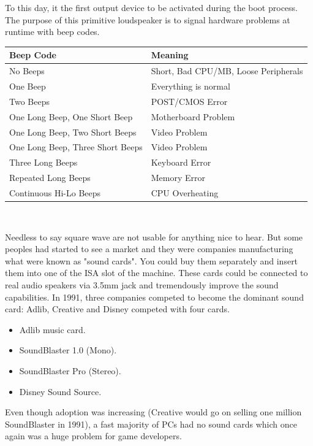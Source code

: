\documentclass[book.tex]{subfiles}
\begin{document}
\par
 To this day, it the first output device to be activated during the boot process. The purpose of this primitive loudspeaker is to signal hardware problems at runtime with beep codes.\\
\par
\begin{tabularx}{\textwidth}{l l}
\textbf{Beep Code} & \textbf{Meaning}  \\ \hline
No Beeps                         & Short, Bad CPU/MB, Loose Peripherals \\ \hline
One Beep                         & Everything is normal\\ \hline
Two Beeps                        & POST/CMOS Error \\ \hline 
One Long Beep, One Short Beep    & Motherboard Problem \\ \hline
One Long Beep, Two Short Beeps   & Video Problem \\ \hline
One Long Beep, Three Short Beeps & Video Problem \\ \hline
Three Long Beeps                 & Keyboard Error \\ \hline
Repeated Long Beeps              & Memory Error \\ \hline
Continuous Hi-Lo Beeps           & CPU Overheating \\ \hline
\end{tabularx}\\
\bigskip
\par
Needless to say square wave are not usable for anything nice to hear. But some peoples had started to see a market and they were companies manufacturing what were known as "sound cards". You could buy them separately and insert them into one of the ISA slot of the machine. These cards could be connected to real audio speakers via 3.5mm jack and tremendously improve the sound capabilities. In 1991, three companies competed to become the dominant sound card: Adlib, Creative and Disney competed with four cards.\\
\par
\begin{itemize}
\item Adlib music card.
\item SoundBlaster 1.0 (Mono).
\item SoundBlaster Pro (Stereo).
\item Disney Sound Source.
\end{itemize}
\par
Even though adoption was increasing (Creative would go on selling one million SoundBlaster in 1991), a fast majority of PCs had no sound cards which once again was a huge problem for game developers.
\end{document}

